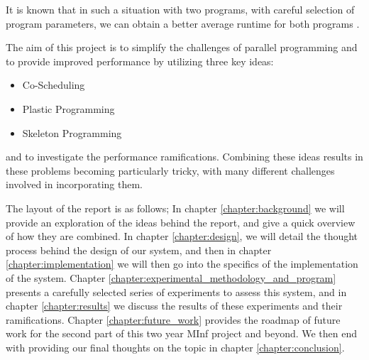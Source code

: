 It is known that in such a situation with two programs, with careful selection of program parameters, we can obtain a better average runtime for both programs \cite{lira}.

The aim of this project is to simplify the challenges of parallel programming and to provide improved performance by utilizing three key ideas:

\begin{itemize}
	\item Co-Scheduling
	\item Plastic Programming
	\item Skeleton Programming
\end{itemize}

and to investigate the performance ramifications. Combining these ideas results in these problems becoming particularly tricky, with many different challenges involved in incorporating them.

The layout of the report is as follows; In chapter \ref{chapter:background} we will provide an exploration of the ideas behind the report, and give a quick overview of how they are combined. In chapter \ref{chapter:design}, we will detail the thought process behind the design of our system, and then in chapter \ref{chapter:implementation} we will then go into the specifics of the implementation of the system. Chapter \ref{chapter:experimental_methodology_and_program} presents a carefully selected series of experiments to assess this system, and in chapter \ref{chapter:results} we discuss the results of these experiments and their ramifications. Chapter \ref{chapter:future_work} provides the roadmap of future work for the second part of this two year MInf project and beyond. We then end with providing our final thoughts on the topic in chapter \ref{chapter:conclusion}.
